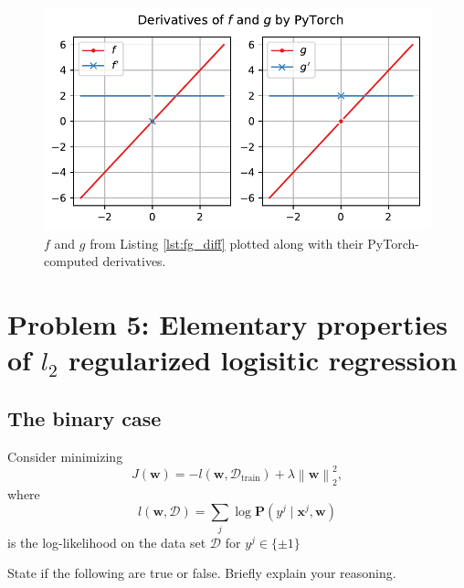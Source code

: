 \documentclass[letterpaper,11pt]{article}
\begin{document}
\begin{figure}[h]
  \centering
  \includegraphics{problem4/problem4_differentiable.pdf}
  \caption{$f$ and $g$ from Listing \ref{lst:fg_diff} plotted along with
    their PyTorch-computed derivatives.}
  \label{fig:problem4_differentiable}
\end{figure}

\section*{Problem 5: Elementary properties of $l_2$ regularized logisitic regression}

\subsection*{The binary case}

Consider minimizing
\begin{equation}
  J(\mathbf{w}) = -l\left(\mathbf{w},\mathcal{D}_\mathrm{train}\right) + \lambda\left\lVert\mathbf{w}\right\rVert_2^2,
\end{equation}
where
\begin{equation}
  l\left(\mathbf{w},\mathcal{D}\right) = \sum_j \log \mathbf{P}\left(
    y^j \mid \mathbf{x}^j, \mathbf{w}
  \right)
\end{equation}
is the log-likelihood on the data set $\mathcal{D}$ for
$y^j \in \{ \pm 1 \}$

State if the following are true or false. Briefly explain your reasoning.
\end{document}
